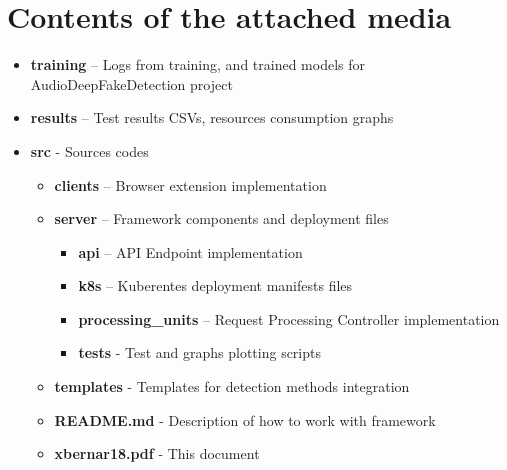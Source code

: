 \chapter{Contents of the attached media}

\begin{itemize}
    \item[] \textbf{training} – Logs from training, and trained models for AudioDeepFakeDetection project
    \item[] \textbf{results} – Test results CSVs, resources consumption graphs
    \item[] \textbf{src} - Sources codes
    \begin{itemize}
        \item[] \textbf{clients} – Browser extension implementation
        \item[] \textbf{server} – Framework components and deployment files
        \begin{itemize}
            \item[] \textbf{api} – API Endpoint implementation
            \item[] \textbf{k8s} – Kuberentes deployment manifests files
            \item[] \textbf{processing\_units} – Request Processing Controller implementation
            \item[] \textbf{tests} - Test and graphs plotting scripts        
        \end{itemize}
        \item[] \textbf{templates} - Templates for detection methods integration
        \item[] \textbf{README.md} - Description of how to work with framework
        \item[] \textbf{xbernar18.pdf} - This document
    \end{itemize}
\end{itemize}

